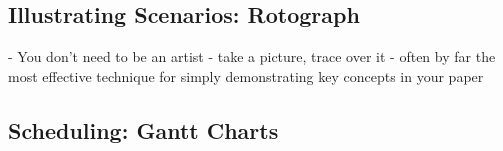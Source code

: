 







\newpage
\subsection{Illustrating Scenarios: Rotograph}

- You don't need to be an artist
- take a picture, trace over it
- often by far the most effective technique for simply demonstrating key concepts in your paper 


\newpage
\subsection{Scheduling: Gantt Charts}

